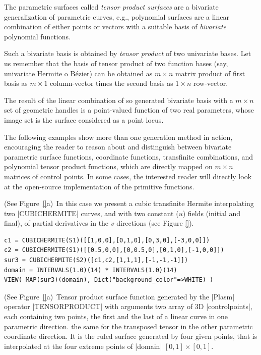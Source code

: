 \begin{coding}[Algebraic computation of FE = $\delta_1$]
\begin{definition}
The parametric surfaces called \emph{tensor product surfaces} are a
bivariate generalization of parametric curves, e.g., 
polynomial surfaces are a linear combination of either points or
vectors with a suitable basis of \emph{bivariate} polynomial
functions.  
\end{definition}
Such a bivariate basis is obtained by \emph{tensor product}
of two univariate bases.  Let us remember that the basis of tensor product of two function bases (say, univariate Hermite o Bézier) can be obtained as $m\times n$ matrix product of first basis as $m\times 1$ column-vector times the second basis as $1\times n$ row-vector. 

The result of the linear combination of so generated 
bivariate basis with a $m\times n$ set of geometric handles is a point-valued
function of two real parameters, whose image set is the surface
considered as a point locus. 
 
The following examples show more than one generation method in action, encouraging the reader to reason about and distinguish between bivariate parametric surface functions, coordinate functions, transfinite combinations, and polynomial tensor product functions, which are directly mapped on $ m \times n$ matrices of control points. In some cases, the interested reader will directly look at the open-source implementation of the primitive functions.

\begin{condition} (See Figure~\ref{}a)\
In this case we present a cubic transfinite Hermite interpolating two |CUBICHERMITE| curves, and with two constant ($u$) fields (initial and final), of partial derivatives in the $v$ directions (see Figure \ref{}).
 \begin{lstlisting}[language=JuliaLocal, style=julia, mathescape=true]
c1 = CUBICHERMITE(S1)([[1,0,0],[0,1,0],[0,3,0],[-3,0,0]])
c2 = CUBICHERMITE(S1)([[0.5,0,0],[0,0.5,0],[0,1,0],[-1,0,0]])
sur3 = CUBICHERMITE(S2)([c1,c2,[1,1,1],[-1,-1,-1]])
domain = INTERVALS(1.0)(14) * INTERVALS(1.0)(14)
VIEW( MAP(sur3)(domain), Dict("background_color"=>WHITE) )
\end{lstlisting}
\end{condition}


\begin{condition}[(Bilinear surface] (See Figure~\ref{}a)\
Tensor product surface function generated by the |Plasm| operator |TENSORPRODUCT| with arguments two array of 3D |controlpoints|, each containing two points, the first and the last of a linear curve in one parametric direction. the same for the transposed tensor in the other parametric coordinate direction. It is the ruled surface generated by four given points, that is interpolated at the four extreme points of |domain| $[0,1]\times[0,1]$. 


\end{condition}
\end{coding}
